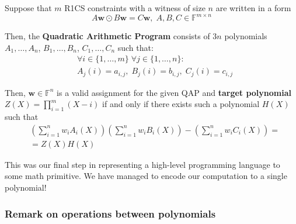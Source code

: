 \documentclass[../lecture-notes.tex]{subfiles}
\begin{document}
\begin{definition}
    Suppose that $m$ R1CS constraints with a witness of size $n$ are written in a form
    \begin{equation*}
        A\mathbf{w} \odot B\mathbf{w} = C\mathbf{w}, \; A,B,C \in \mathbb{F}^{m \times n}
    \end{equation*}

    Then, the \textbf{Quadratic Arithmetic Program} consists of $3n$ polynomials $A_1,\dots,A_n$, $B_1,\dots,B_n$, $C_1,\dots,C_n$ such that:
    \begin{equation*}
        \begin{aligned}
            &\forall i \in \{1,\dots,m\} \; \forall j \in \{1,\dots,n\}: \\
            &A_j(i) = a_{i,j}, \; B_j(i) = b_{i,j}, \; C_j(i) = c_{i,j}            
        \end{aligned}
    \end{equation*}

    Then, $\mathbf{w} \in \mathbb{F}^n$ is a valid assignment for the given QAP and \textbf{target polynomial} $Z(X) = \prod_{i=1}^m (X-i)$ if and only if there exists such a polynomial $H(X)$ such that
    \begin{equation*}
        \begin{aligned}
            &\left( \sum_{i = 1}^{n} w_iA_i(X) \right)\left( \sum_{i = 1}^{n} w_iB_i(X) \right) - \left( \sum_{i = 1}^{n} w_iC_i(X) \right) = \\ &= Z(X)H(X)            
        \end{aligned}
    \end{equation*}
\end{definition}

This was our final step in representing a high-level programming language to some math primitive.
We have managed to encode our computation to a single polynomial!

\subsubsection*{Remark on operations between polynomials}
\end{document}
